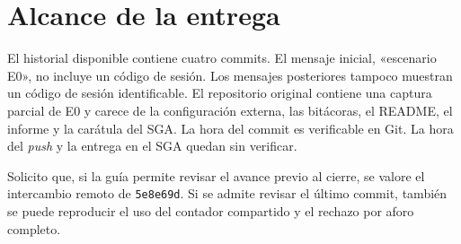 \documentclass[11pt,a4paper]{article}
\begin{document}
\section*{Alcance de la entrega}
El historial disponible contiene cuatro commits. El mensaje inicial, «escenario E0», no incluye un código de sesión. Los mensajes posteriores tampoco muestran un código de sesión identificable. El repositorio original contiene una captura parcial de E0 y carece de la configuración externa, las bitácoras, el README, el informe y la carátula del SGA. La hora del commit es verificable en Git. La hora del \textit{push} y la entrega en el SGA quedan sin verificar.

Solicito que, si la guía permite revisar el avance previo al cierre, se valore el intercambio remoto de \texttt{5e8e69d}. Si se admite revisar el último commit, también se puede reproducir el uso del contador compartido y el rechazo por aforo completo.

\newpage
\end{document}
